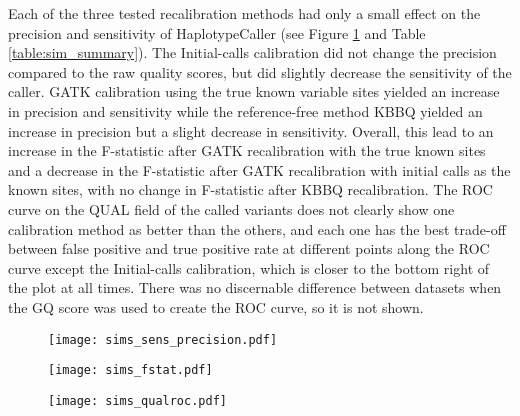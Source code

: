 Each of the three tested recalibration methods had only a small effect on the precision and sensitivity of HaplotypeCaller (see Figure \ref{fig:sim_sens_precision} and Table \ref{table:sim_summary}). The Initial-calls calibration did not change the precision compared to the raw quality scores, but did slightly decrease the sensitivity of the caller. GATK calibration using the true known variable sites yielded an increase in precision and sensitivity while the reference-free method KBBQ yielded an increase in precision but a slight decrease in sensitivity. Overall, this lead to an increase in the F-statistic after GATK recalibration with the true known sites and a decrease in the F-statistic after GATK recalibration with initial calls as the known sites, with no change in F-statistic after KBBQ recalibration. The ROC curve on the QUAL field of the called variants does not clearly show one calibration method as better than the others, and each one has the best trade-off between false positive and true positive rate at different points along the ROC curve except the Initial-calls calibration, which is closer to the bottom right of the plot at all times. There was no discernable difference between datasets when the GQ score was used to create the ROC curve, so it is not shown.

\begin{figure}
\centering
\texttt{[image: sims\_sens\_precision.pdf]}
\label{fig:sim_sens_precision}
\end{figure}

\begin{figure}
\centering
\texttt{[image: sims\_fstat.pdf]}
\label{fig:sim_fstat}
\end{figure}

\begin{figure}
\centering
\texttt{[image: sims\_qualroc.pdf]}
\label{fig:sim_qualroc}
\end{figure}


